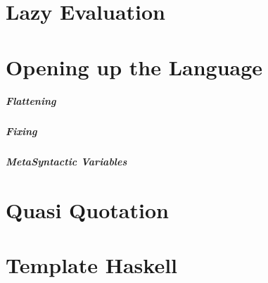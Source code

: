 \documentclass[thesis-solanki.tex]{subfiles}
\begin{document}









\section{Lazy Evaluation}







\section{Opening up the Language}

\subparagraph{Flattening}

\subparagraph{Fixing}

\subparagraph{MetaSyntactic Variables}






\section{Quasi Quotation}







\section{Template Haskell}
\end{document}
